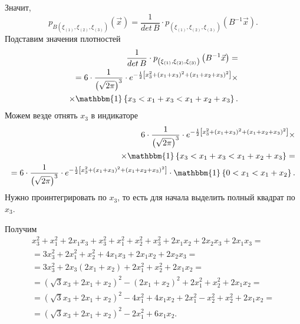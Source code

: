 \begin{enumerate}[label=\alph*)]
  Значит,
  $$p_{B \left( \xi_{ \left( 1 \right) }, \xi_{ \left( 2 \right) }, \xi_{ \left( 3 \right) } \right) }
      \left( \vec{x} \right) =
    \frac{1}{det \, B} \cdot
    p_{ \left( \xi_{ \left( 1 \right) }, \xi_{ \left( 2 \right) }, \xi_{ \left( 3 \right) } \right) }
      \left( B^{-1} \vec{x} \right).$$
  Подставим значения плотностей
  \begin{equation*}
    \begin{split}
      \frac{1}{det \, B} \cdot
      p_{ \left( \xi_{ \left( 1 \right) }, \xi_{ \left( 2 \right) }, \xi_{ \left( 3 \right) } \right) }
        \left( B^{-1} \vec{x} \right) = \\
      = 6 \cdot \frac{1}{ \left( \sqrt{2 \pi } \right)^3} \cdot
      e^{- \frac{1}{2} \left[ x_3^2 + \left( x_1 + x_3 \right)^2 + \left( x_1 + x_2 + x_3 \right)^2 \right] } \times \\
      \times \mathbbm{1} \left\{ x_3 < x_1 + x_3 < x_1 + x_2 + x_3 \right\}.
    \end{split}
  \end{equation*}
  Можем везде отнять $x_3$ в индикаторе
  \begin{equation*}
    \begin{split}
      6 \cdot \frac{1}{ \left( \sqrt{2 \pi } \right)^3} \cdot
      e^{- \frac{1}{2} \left[ x_3^2 + \left( x_1 + x_3 \right)^2 + \left( x_1 + x_2 + x_3 \right)^2 \right] } \times \\
      \times \mathbbm{1} \left\{ x_3 < x_1 + x_3 < x_1 + x_2 + x_3 \right\} = \\
      = 6 \cdot \frac{1}{ \left( \sqrt{2 \pi } \right)^3} \cdot
      e^{- \frac{1}{2} \left[ x_3^2 + \left( x_1 + x_3 \right)^2 + \left( x_1 + x_2 + x_3 \right)^2 \right] } \cdot
      \mathbbm{1} \left\{ 0 < x_1 < x_1 + x_2 \right\}.
    \end{split}
  \end{equation*}
  Нужно проинтегрировать по $x_3$, то есть для начала выделить полный квадрат по $x_3$.

  Получим
  \begin{equation*}
    \begin{split}
      x_3^2 + x_1^2 + 2x_1 x_3 + x_3^2 + x_1^2 + x_2^2 + x_3^2 + 2x_1 x_2 + 2x_2 x_3 + 2x_1 x_3 = \\
      = 3x_3^2 + 2x_1^2 + x_2^2 + 4x_1 x_3 + 2x_1 x_2 + 2x_2 x_3 = \\
      = 3x_3^2 + 2x_3 \left( 2x_1 + x_2 \right) + 2x_1^2 + x_2^2 +2x_1x_2 = \\
      = \left( \sqrt{3} x_3 + 2x_1 + x_2 \right)^2 - \left( 2x_1 + x_2 \right)^2 + 2x_1^2 + x_2^2 +
      2x_1 x_2 = \\
      = \left( \sqrt{3} x_3 + 2x_1 + x_2 \right)^2 - 4x_1^2 + 4x_1 x_2 + 2x_1^2 - x_2^2 + x_2^2 +
      2x_1 x_2 = \\
      = \left( \sqrt{3} x_3 + 2x_1 + x_2 \right)^2 - 2x_1^2 + 6x_1 x_2.
    \end{split}
  \end{equation*}


\end{enumerate}
